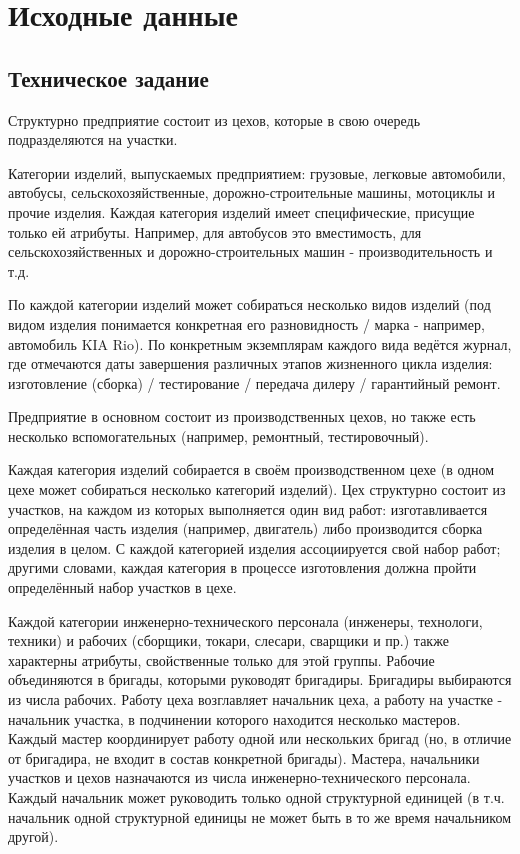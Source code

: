 





\tableofcontents
\newpage

\section{Исходные данные}

\subsection{Техническое задание}
Структурно предприятие состоит из цехов, которые в свою очередь подразделяются на участки.

Категории изделий, выпускаемых предприятием: грузовые, легковые автомобили, автобусы, сельскохозяйственные, дорожно-строительные машины, мотоциклы и прочие изделия.
Каждая категория изделий имеет специфические, присущие только ей атрибуты.
Например, для автобусов это вместимость, для сельскохозяйственных и дорожно-строительных машин - производительность и т.д.

По каждой категории изделий может собираться несколько видов изделий (под видом изделия понимается конкретная его разновидность / марка - например, автомобиль KIA Rio).
По конкретным экземплярам каждого вида ведётся журнал, где отмечаются даты завершения различных этапов жизненного цикла изделия: изготовление (сборка) / тестирование / передача дилеру / гарантийный ремонт.

Предприятие в основном состоит из производственных цехов, но также есть несколько вспомогательных (например, ремонтный, тестировочный).

Каждая категория изделий собирается в своём производственном цехе (в одном цехе может собираться несколько категорий изделий).
Цех структурно состоит из участков, на каждом из которых выполняется один вид работ: изготавливается определённая часть изделия (например, двигатель) либо производится сборка изделия в целом.
С каждой категорией изделия ассоциируется свой набор работ; другими словами, каждая категория в процессе изготовления должна пройти определённый набор участков в цехе.

Каждой категории инженерно-технического персонала (инженеры, технологи, техники) и рабочих (сборщики, токари, слесари, сварщики и пр.) также характерны атрибуты, свойственные только для этой группы.
Рабочие объединяются в бригады, которыми руководят бригадиры.
Бригадиры выбираются из числа рабочих.
Работу цеха возглавляет начальник цеха, а работу на участке - начальник участка, в подчинении которого находится несколько мастеров.
Каждый мастер координирует работу одной или нескольких бригад (но, в отличие от бригадира, не входит в состав конкретной бригады).
Мастера, начальники участков и цехов назначаются из числа инженерно-технического персонала.
Каждый начальник может руководить только одной структурной единицей (в т.ч. начальник одной структурной единицы не может быть в то же время начальником другой).

